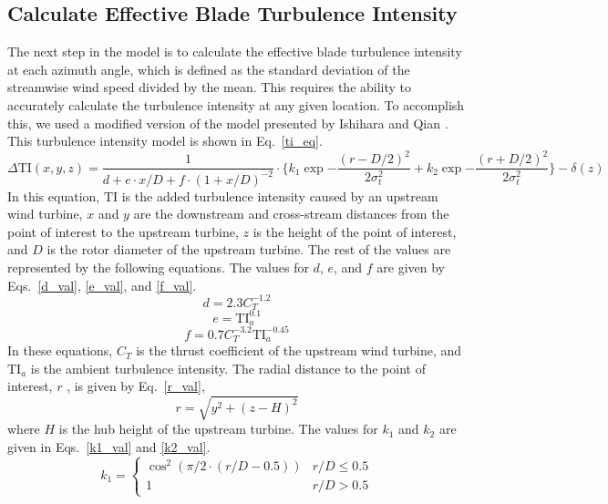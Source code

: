 \documentclass[11pt,letterpaper]{article}
\begin{document}
\subsection{Calculate Effective Blade Turbulence Intensity}
\label{sec:TI}

The next step in the model is to calculate the effective blade turbulence intensity at each azimuth angle, which is defined as the standard deviation of the streamwise wind speed divided by the mean. This requires the ability to accurately calculate the turbulence intensity at any given location. To accomplish this, we used a modified version of the model presented by Ishihara and Qian \cite{ishihara2018new}. This turbulence intensity model is shown in Eq.~\ref{ti_eq}.
%
\begin{equation}
    \label{ti_eq}
    \Delta \text{TI}(x,y,z) = \frac{1}{d + e \cdot x/D + f\cdot(1+x/D)^{-2}} \cdot \Big\{k_1 \exp{-\frac{(r-D/2)^2}{2\sigma_t^2}} + k_2 \exp{-\frac{(r+D/2)^2}{2\sigma_t^2}} \Big\} - \delta(z)
\end{equation}
% 
In this equation, $\text{TI}$ is the added turbulence intensity caused by an upstream wind turbine, $x$ and $y$ are the downstream and cross-stream distances from the point of interest to the upstream turbine, $z$ is the height of the point of interest, and $D$ is the rotor diameter of the upstream turbine. The rest of the values are represented by the following equations. The values for $d$, $e$, and $f$ are given by Eqs.~\ref{d_val}, \ref{e_val}, and \ref{f_val}.
%
\begin{equation}
    \label{d_val}
    d = 2.3C_T^{-1.2}
\end{equation}
%
\begin{equation}
    \label{e_val}
    e = \text{TI}_a^{0.1}
\end{equation}
%
\begin{equation}
    \label{f_val}
    f = 0.7C_T^{-3.2} \text{TI}_a^{-0.45}
\end{equation}
In these equations, $C_T$ is the thrust coefficient of the upstream wind turbine, and $\text{TI}_a$ is the ambient turbulence intensity. The radial distance to the point of interest, $r$ , is given by Eq.~\ref{r_val},
%
\begin{equation}
    \label{r_val}
    r = \sqrt{y^2 + (z-H)^2}
\end{equation}
where $H$ is the hub height of the upstream turbine. The values for $k_1$ and $k_2$ are given in Eqs.~\ref{k1_val} and \ref{k2_val}.
%
\begin{equation}
    \label{k1_val}
    k_1 = \begin{cases} 
      \cos^2{(\pi/2 \cdot (r/D - 0.5))} & r/D \leq 0.5 \\
      1 & r/D > 0.5
   \end{cases}
\end{equation}
\end{document}
